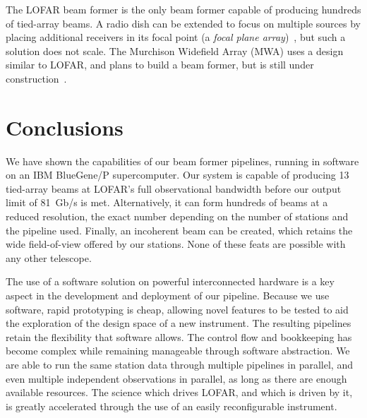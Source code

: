\documentclass{llncs}
\begin{document}
The LOFAR beam former is the only beam former capable of producing hundreds of tied-array beams. A radio dish can be extended to focus on multiple sources by placing additional receivers in its focal point (a \emph{focal plane array})~\cite{Staveley-Smith:96}, but such a solution does not scale. The Murchison Widefield Array (MWA) uses a design similar to LOFAR, and plans to build a beam former, but is still under construction~\cite{Lonsdale:09}.



\section{Conclusions}
\label{Sec:conclusions}

We have shown the capabilities of our beam former pipelines, running in software on an IBM BlueGene/P supercomputer. Our system is capable of producing 13 tied-array beams at LOFAR's full observational bandwidth before our output limit of 81~Gb/s is met. Alternatively, it can form hundreds of beams at a reduced resolution, the exact number depending on the number of stations and the pipeline used. Finally, an incoherent beam can be created, which retains the wide field-of-view offered by our stations. None of these feats are possible with any other telescope.

The use of a software solution on powerful interconnected hardware is a key aspect in the development and deployment of our pipeline. Because we use software, rapid prototyping is cheap, allowing novel features to be tested to aid the exploration of the design space of a new instrument. The resulting pipelines retain the flexibility that software allows. The control flow and bookkeeping has become complex while remaining manageable through software abstraction. We are able to run the same station data through multiple pipelines in parallel, and even multiple independent observations in parallel, as long as there are enough available resources. The science which drives LOFAR, and which is driven by it, is greatly accelerated through the use of an easily reconfigurable instrument.
\end{document}

